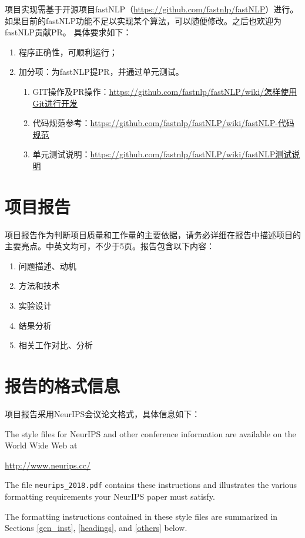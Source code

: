 \documentclass{article}
\begin{document}
项目实现需基于开源项目fastNLP（\url{https://github.com/fastnlp/fastNLP}）进行。如果目前的fastNLP功能不足以实现某个算法，可以随便修改。之后也欢迎为fastNLP贡献PR。
具体要求如下：
\begin{enumerate}
    \item 程序正确性，可顺利运行；
    \item 加分项：为fastNLP提PR，并通过单元测试。
    \begin{enumerate}
        \item  GIT操作及PR操作：\url{https://github.com/fastnlp/fastNLP/wiki/怎样使用Git进行开发}
        \item 代码规范参考：\url{https://github.com/fastnlp/fastNLP/wiki/fastNLP-代码规范}
        \item 单元测试说明：\url{https://github.com/fastnlp/fastNLP/wiki/fastNLP测试说明}
    \end{enumerate}
\end{enumerate}


\section{项目报告}
 项目报告作为判断项目质量和工作量的主要依据，请务必详细在报告中描述项目的主要亮点。中英文均可，不少于5页。报告包含以下内容：
\begin{enumerate}
    \item 问题描述、动机
    \item 方法和技术
    \item 实验设计
    \item 结果分析
    \item 相关工作对比、分析
\end{enumerate}


\section{报告的格式信息}
项目报告采用NeurIPS会议论文格式，具体信息如下：

The style files for NeurIPS and other conference information are available on
the World Wide Web at
\begin{center}
  \url{http://www.neurips.cc/}
\end{center}
The file \verb+neurips_2018.pdf+ contains these instructions and illustrates the
various formatting requirements your NeurIPS paper must satisfy.

The formatting instructions contained in these style files are summarized in
Sections \ref{gen_inst}, \ref{headings}, and \ref{others} below.
\end{document}
